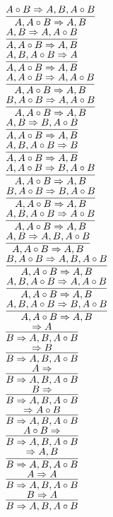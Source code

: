 \documentclass[11pt]{article}
\begin{document}
\begin{center}
\bigskip
\\$\infer{A, A\circ B\Rightarrow A, B}{A\circ B\Rightarrow A, B, A\circ B}$
\bigskip
\\$\infer{A, A\circ B\Rightarrow A, B}{A, B\Rightarrow A, A\circ B}$
\bigskip
\\$\infer{A, A\circ B\Rightarrow A, B}{A, B, A\circ B\Rightarrow A}$
\bigskip
\\$\infer{A, A\circ B\Rightarrow A, B}{A, A\circ B\Rightarrow A, A\circ B}$
\bigskip
\\$\infer{A, A\circ B\Rightarrow A, B}{B, A\circ B\Rightarrow A, A\circ B}$
\bigskip
\\$\infer{A, A\circ B\Rightarrow A, B}{A, B\Rightarrow B, A\circ B}$
\bigskip
\\$\infer{A, A\circ B\Rightarrow A, B}{A, B, A\circ B\Rightarrow B}$
\bigskip
\\$\infer{A, A\circ B\Rightarrow A, B}{A, A\circ B\Rightarrow B, A\circ B}$
\bigskip
\\$\infer{A, A\circ B\Rightarrow A, B}{B, A\circ B\Rightarrow B, A\circ B}$
\bigskip
\\$\infer{A, A\circ B\Rightarrow A, B}{A, B, A\circ B\Rightarrow A\circ B}$
\bigskip
\\$\infer{A, A\circ B\Rightarrow A, B}{A, B\Rightarrow A, B, A\circ B}$
\bigskip
\\$\infer{A, A\circ B\Rightarrow A, B}{B, A\circ B\Rightarrow A, B, A\circ B}$
\bigskip
\\$\infer{A, A\circ B\Rightarrow A, B}{A, B, A\circ B\Rightarrow A, A\circ B}$
\bigskip
\\$\infer{A, A\circ B\Rightarrow A, B}{A, B, A\circ B\Rightarrow B, A\circ B}$
\bigskip
\\$\infer{B\Rightarrow A, B, A\circ B}{\Rightarrow A}$
\bigskip
\\$\infer{B\Rightarrow A, B, A\circ B}{\Rightarrow B}$
\bigskip
\\$\infer{B\Rightarrow A, B, A\circ B}{A\Rightarrow }$
\bigskip
\\$\infer{B\Rightarrow A, B, A\circ B}{B\Rightarrow }$
\bigskip
\\$\infer{B\Rightarrow A, B, A\circ B}{\Rightarrow A\circ B}$
\bigskip
\\$\infer{B\Rightarrow A, B, A\circ B}{A\circ B\Rightarrow }$
\bigskip
\\$\infer{B\Rightarrow A, B, A\circ B}{\Rightarrow A, B}$
\bigskip
\\$\infer{B\Rightarrow A, B, A\circ B}{A\Rightarrow A}$
\bigskip
\\$\infer{B\Rightarrow A, B, A\circ B}{B\Rightarrow A}$

\end{center}
\end{document}
